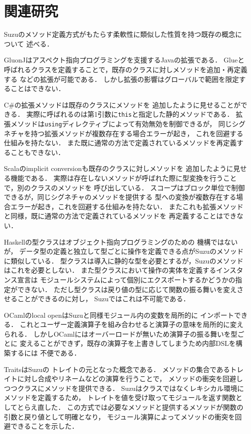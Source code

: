 \documentclass[a4paper,11pt,dvipdfmx]{jreport}
\begin{document}
\chapter{関連研究}
\label{chapter:related-work}

Suzuのメソッド定義方式がもたらす柔軟性に類似した性質を持つ既存の概念について
述べる．

GluonJ\cite{GluonJ}はアスペクト指向プログラミングを支援するJavaの拡張である．
Glueと呼ばれるクラスを定義することで，既存のクラスに対しメソッドを追加・再定義する
などの拡張が可能である．
しかし拡張の影響はグローバルで範囲を限定することはできない．

C\#の拡張メソッド\cite{ExtentionMethods}は既存のクラスにメソッドを
追加したように見せることができる．
実際に呼ばれるのは第1引数に\verb|this|と指定した静的メソッドである．
拡張メソッドは\verb|using|ディレクティブによって有効無効を制御できるが，
同じシグネチャを持つ拡張メソッドが複数存在する場合エラーが起き，
これを回避する仕組みを持たない．
また既に通常の方法で定義されているメソッドを再定義することもできない．

Scala\cite{Scala}のimplicit conversionも既存のクラスに対しメソッドを
追加したように見せる機能である．
実際は存在しないメソッドが呼ばれた際に型変換を行うことで，別のクラスのメソッドを
呼び出している．
スコープはブロック単位で制御できるが，同じシグネチャのメソッドを提供する
型への変換が複数存在する場合エラーが起き，これを回避する仕組みを持たない．
またこれも拡張メソッドと同様，既に通常の方法で定義されているメソッドを
再定義することはできない．

Haskellの型クラス\cite{TypeClasses}はオブジェクト指向プログラミングのための
機構ではないが，
データ型の定義と独立して型ごとに操作を定義できる点がSuzuのメソッドに類似している．
型クラスは導入に静的な型を必要とするが，Suzuのメソッドはこれを必要としない．
また型クラスにおいて操作の実体を定義するインスタンス宣言は
モジュールシステムによって個別にエクスポートするかどうかの指定ができない．
ただし型クラスは戻り値の型に応じて関数の振る舞いを変えさせることができるのに対し，
Suzuではこれは不可能である．

OCaml\cite{OCaml}のlocal openはSuzuと同様モジュール内の変数を局所的に
インポートできる．
これとユーザー定義演算子を組み合わせると演算子の意味を局所的に変えられる．
しかしOCamlにはオーバーロードが無いため演算子の振る舞いを型ごとに
変えることができず，既存の演算子を上書きしてしまうため内部DSLを構築するには
不便である．

Traits\cite{Traits,ApplyingTraits,FineGrainedReuse}はSuzuの
トレイトの元となった概念である．
メソッドの集合であるトレイトに対し合成やリネームなどの演算を行うことで，
メソッドの衝突を回避しつつクラスにメソッドを提供できる．
Suzuはクラスではなくレキシカル環境にメソッドを定義するため，
トレイトを値を受け取ってモジュールを返す関数としてとらえ直した．
この方式では必要なメソッドと提供するメソッドが関数の引数と戻り値として明確となり，
モジュール演算によってメソッドの衝突を回避できることを示した．
\end{document}
